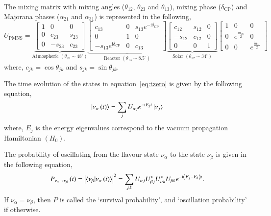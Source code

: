 The mixing matrix with mixing angles ($\theta_{12}$, $\theta_{23}$ and
$\theta_{13}$), mixing phase ($\delta_{\mathrm{CP}}$) and Majorana phases
($\alpha_{21}$ and $\alpha_{31}$) is represented in the following,
\begin{equation}
  U_{\mathrm{PMNS}} =
  \underbrace{\begin{bmatrix}
      1 & 0 & 0 \\
      0 & c_{23} & s_{23} \\
      0 & -s_{23} & c_{23}
    \end{bmatrix}
  }_{\text{Atmospheric }\left(\theta_{23}\sim 48^{\circ}\right)}
  \underbrace{\begin{bmatrix}
      c_{13} & 0 & s_{13}e^{-\mathrm{i}\delta_{\mathrm{CP}}} \\
      0 & 1 & 0 \\
      -s_{13}e^{\mathrm{i}\delta_{\mathrm{CP}}} & 0 & c_{13}
    \end{bmatrix}
  }_{\text{Reactor }\left(\theta_{13}\sim 8.5^{\circ}\right)}
  \underbrace{\begin{bmatrix}
      c_{12} & s_{12} & 0 \\
      -s_{12} & c_{12} & 0 \\
      0 & 0 & 1
    \end{bmatrix}
  }_{\text{Solar }\left(\theta_{12}\sim 34^{\circ}\right)}
  \begin{bmatrix}
    1 & 0 & 0 \\
    0 & e^{\frac{i\alpha_{21}}{2}} & 0 \\
    0 & 0 & e^{\frac{i\alpha_{31}}{2}}
  \end{bmatrix}
  \label{eq:pmns}
\end{equation}
where, $c_{jk}=\cos\theta_{jk}$ and $s_{jk}=\sin\theta_{jk}$.

The time evolution of the states in equation~\ref{eq:tzero} is given
by the following equation,
\begin{equation}
  \ket{\nu_{\alpha}\left(t\right)}=\sum_{j}U_{\alpha j}e^{-\mathrm{i}E_{j}t}\ket{\nu_{j}} \label{eq:ttime}
\end{equation}
where, $E_{j}$ is the energy eigenvalues correspond to the vacuum
propagation Hamiltonian $\left(H_0\right)$.

The probability of oscillating from the flavour state $\nu_\alpha$ to
the state $\nu_\beta$ is given in the following equation,
\begin{equation}
  P_{\nu_\alpha\rightarrow\nu_\beta}\left(t\right) = \left|\braket{\nu_\beta|\nu_\alpha\left(t\right)}\right|^2 = \sum_{j,k}U_{\alpha j}U^{*}_{\beta j}U^{*}_{\alpha k}U_{\beta k}e^{-\mathrm{i}\left(E_{j}-E_{k}\right)t}.
  \label{eq:oscprob}
\end{equation}
If $\nu_\alpha=\nu_\beta$, then $P$ is called the `survival probability',
and `oscillation probability' if otherwise.

